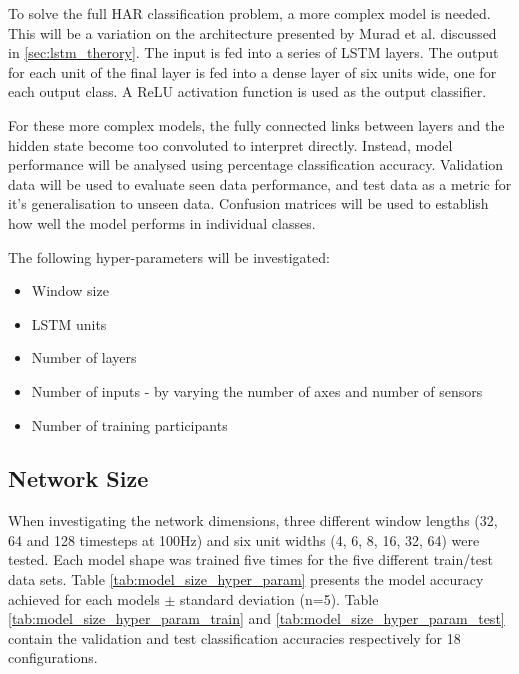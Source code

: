 \documentclass[sensors,article,submit,moreauthors,pdftex]{Definitions/mdpi}
\begin{document}
To solve the full HAR classification problem, a more complex model is needed. This will be a variation on the architecture presented by Murad et al. discussed in \ref{sec:lstm_therory}. The input is fed into a series of LSTM layers. The output for each unit of the final layer is fed into a dense layer of six units wide, one for each output class. A ReLU activation function is used as the output classifier.

For these more complex models, the fully connected links between layers and the hidden state become too convoluted to interpret directly. Instead, model performance will be analysed using percentage classification accuracy. Validation data will be used to evaluate seen data performance, and test data as a metric for it's generalisation to unseen data. Confusion matrices will be used to establish how well the model performs in individual classes.

The following hyper-parameters will be investigated:
\begin{itemize}
    \item Window size
    \item LSTM units
    \item Number of layers
    \item Number of inputs - by varying the number of axes and number of sensors
    \item Number of training participants 
\end{itemize}

\subsection{Network Size}
When investigating the network dimensions, three different window lengths (32, 64 and 128 timesteps at 100Hz) and six unit widths (4, 6, 8, 16, 32, 64) were tested. Each model shape was trained five times for the five different train/test data sets. Table \ref{tab:model_size_hyper_param} presents the model accuracy achieved for each models $\pm$ standard deviation (n=5). Table \ref{tab:model_size_hyper_param_train} and \ref{tab:model_size_hyper_param_test} contain the validation and test classification accuracies respectively for 18 configurations.
\end{document}
